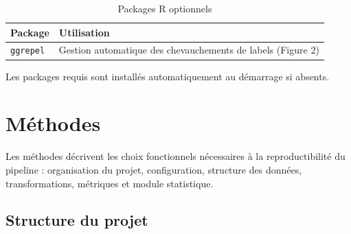\documentclass[11pt,a4paper]{article}
\begin{document}
\begin{table}[htbp]
  \centering
  \caption{Packages R optionnels}
  \begin{tabularx}{\textwidth}{lX}
    \toprule
    \textbf{Package} & \textbf{Utilisation} \\
    \midrule
    \texttt{ggrepel} & Gestion automatique des chevauchements de labels (Figure 2) \\
    \bottomrule
  \end{tabularx}
\end{table}

Les packages requis sont installés automatiquement au démarrage si absents.

\section{Méthodes}

Les méthodes décrivent les choix fonctionnels nécessaires à la reproductibilité du pipeline :
organisation du projet, configuration, structure des données, transformations, métriques et
module statistique.

\subsection{Structure du projet}
\end{document}
